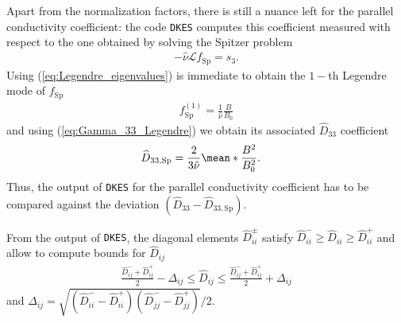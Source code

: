 \documentclass[10pt]{iopart}
\newcommand{\Lorentz}{\mathcal{L}}
\newcommand{\DKES}{{\texttt{DKES}}}
\begin{document}
Apart from the normalization factors, there is still a nuance left for the parallel conductivity coefficient: the code {\DKES} computes this coefficient measured with respect to the one obtained by solving the Spitzer problem
%
\begin{align}
	-\hat{\nu} \Lorentz f_{\text{Sp}} = s_3.
\end{align}
Using (\ref{eq:Legendre_eigenvalues}) is immediate to obtain the $1-$th Legendre mode of $f_{\text{Sp}}$
%
\begin{align}
	f_{\text{Sp}}^{(1)} =  \frac{1}{\hat{\nu}} \frac{B}{B_0}
\end{align}
and using (\ref{eq:Gamma_33_Legendre}) we obtain its associated $\widehat{D}_{33}$ coefficient
\begin{align}
	\widehat{D}_{33,\text{Sp}} & = \frac{2}{3\hat{\nu}} \mean*{\frac{B^2}{B_0^2}}.
\end{align}
Thus, the output of {\DKES} for the parallel conductivity coefficient has to be compared against the deviation $(\widehat{D}_{33} - \widehat{D}_{33,\text{Sp}})$. 

From the output of {\DKES}, the diagonal elements $\widehat{D}_{ii}^{\pm}$ satisfy $\widehat{D}_{ii}^{-} \ge \widehat{D}_{ii} \ge\widehat{D}_{ii}^{+}$ and allow to compute bounds for $\widehat{D}_{ij}$
%
\begin{align}
	\frac{\widehat{D}_{ij}^{-} + \widehat{D}_{ij}^{+}}{2}
	-
	\Delta_{ij}
	\le
	\widehat{D}_{ij}
	\le
	\frac{\widehat{D}_{ij}^{-} + \widehat{D}_{ij}^{+}}{2}
	+
	\Delta_{ij}
\end{align}
and $\Delta_{ij} = \sqrt{(\widehat{D}_{ii}^{-} - \widehat{D}_{ii}^{+})(\widehat{D}_{jj}^{-} - \widehat{D}_{jj}^{+})} /2 $.  
\end{document}
